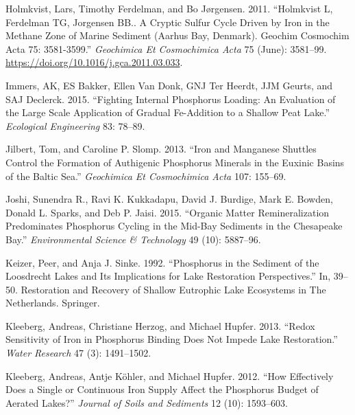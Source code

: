 \documentclass[a4paper,11pt]{article}
\newenvironment{CSLReferences}%
  {}%
  {\par}
\begin{document}
\begin{CSLReferences}{1}{0}
\leavevmode\hypertarget{ref-holmkvistHolmkvistFerdelmanTG2011}{}%
Holmkvist, Lars, Timothy Ferdelman, and Bo Jørgensen. 2011. {``Holmkvist {L}, {Ferdelman TG}, {Jorgensen BB}.. {A} Cryptic Sulfur Cycle Driven by Iron in the Methane Zone of Marine Sediment ({Aarhus Bay}, {Denmark}). {Geochim Cosmochim Acta} 75: 3581-3599.''} \emph{Geochimica Et Cosmochimica Acta} 75 (June): 3581--99. \url{https://doi.org/10.1016/j.gca.2011.03.033}.

\leavevmode\hypertarget{ref-immersFightingInternalPhosphorus2015}{}%
Immers, AK, ES Bakker, Ellen Van Donk, GNJ Ter Heerdt, JJM Geurts, and SAJ Declerck. 2015. {``Fighting Internal Phosphorus Loading: An Evaluation of the Large Scale Application of Gradual {Fe}-Addition to a Shallow Peat Lake.''} \emph{Ecological Engineering} 83: 78--89.

\leavevmode\hypertarget{ref-jilbertIronManganeseShuttles2013}{}%
Jilbert, Tom, and Caroline P. Slomp. 2013. {``Iron and Manganese Shuttles Control the Formation of Authigenic Phosphorus Minerals in the Euxinic Basins of the {Baltic Sea}.''} \emph{Geochimica Et Cosmochimica Acta} 107: 155--69.

\leavevmode\hypertarget{ref-joshiOrganicMatterRemineralization2015}{}%
Joshi, Sunendra R., Ravi K. Kukkadapu, David J. Burdige, Mark E. Bowden, Donald L. Sparks, and Deb P. Jaisi. 2015. {``Organic Matter Remineralization Predominates Phosphorus Cycling in the Mid-Bay Sediments in the {Chesapeake Bay}.''} \emph{Environmental Science \& Technology} 49 (10): 5887--96.

\leavevmode\hypertarget{ref-keizerPhosphorusSedimentLoosdrecht1992}{}%
Keizer, Peer, and Anja J. Sinke. 1992. {``Phosphorus in the Sediment of the {Loosdrecht} Lakes and Its Implications for Lake Restoration Perspectives.''} In, 39--50. Restoration and {Recovery} of {Shallow Eutrophic Lake Ecosystems} in {The Netherlands}. {Springer}.

\leavevmode\hypertarget{ref-kleebergRedoxSensitivityIron2013}{}%
Kleeberg, Andreas, Christiane Herzog, and Michael Hupfer. 2013. {``Redox Sensitivity of Iron in Phosphorus Binding Does Not Impede Lake Restoration.''} \emph{Water Research} 47 (3): 1491--1502.

\leavevmode\hypertarget{ref-kleebergHowEffectivelyDoes2012}{}%
Kleeberg, Andreas, Antje Köhler, and Michael Hupfer. 2012. {``How Effectively Does a Single or Continuous Iron Supply Affect the Phosphorus Budget of Aerated Lakes?''} \emph{Journal of Soils and Sediments} 12 (10): 1593--603.


\end{CSLReferences}
\end{document}
